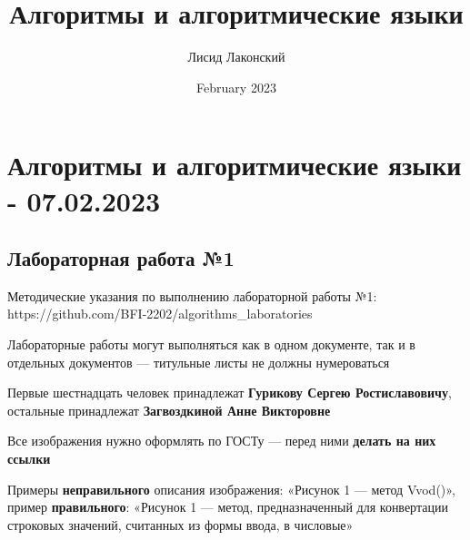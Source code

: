 \documentclass{article}
\title{Алгоритмы и алгоритмические языки}
\author{Лисид Лаконский}
\date{February 2023}
\begin{document}
\raggedright

\maketitle
\tableofcontents
\pagebreak

\section{Алгоритмы и алгоритмические языки - 07.02.2023}

\subsection{Лабораторная работа №1}

Методические указания по выполнению лабораторной работы №1: https://github.com/BFI-2202/algorithms\_laboratories

\hfill

Лабораторные работы могут выполняться как в одном документе, так и в отдельных документов — титульные листы не должны нумероваться

\hfill

Первые шестнадцать человек принадлежат \textbf{Гурикову Сергею Ростиславовичу}, остальные принадлежат \textbf{Загвоздкиной Анне Викторовне}

\hfill

Все изображения нужно оформлять по ГОСТу — перед ними \textbf{делать на них ссылки}

Примеры \textbf{неправильного} описания изображения: «Рисунок 1 — метод Vvod()», пример \textbf{правильного}: «Рисунок 1 — метод, предназначенный для конвертации строковых значений, считанных из формы ввода, в числовые»
\end{document}
